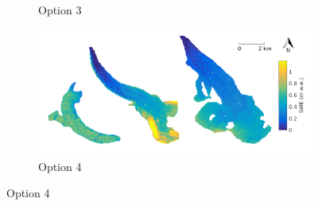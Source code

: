 \documentclass[12pt]{article}
\begin{document}
\begin{figure}
\begin{subfigure}[b]{0.475\textwidth}
            \caption[]%
            {{\small Option 3}}    
        \end{subfigure}
        \quad
        \begin{subfigure}[b]{0.475\textwidth}   
            \centering 
            \includegraphics[width=\textwidth]{BMSmap_Modelled_Observed_Opt4.png}
            \caption[]%
            {{\small Option 4}}    
        \end{subfigure}
        

\end{figure}
\end{document}
